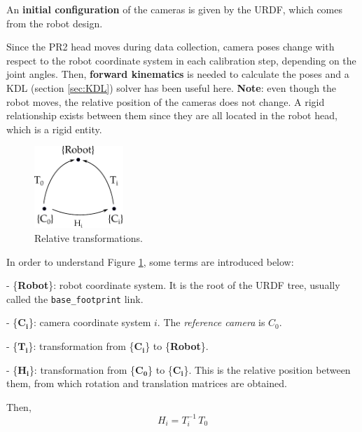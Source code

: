 An \textbf{initial configuration} of the cameras is given by the URDF, which comes from the robot design.

Since the PR2 head moves during data collection, camera poses change with respect to the robot coordinate system in each calibration step, depending on the joint angles. Then, \textbf{forward kinematics} is needed to calculate the poses and a KDL (section \ref{sec:KDL}) solver has been useful here.
\textbf{Note}: even though the robot moves, the relative position of the cameras does not change. A rigid relationship exists between them since they are all located in the robot head, which is a rigid entity.

\begin{figure}[!htbp]
 \centering
 \includegraphics[width=0.3\textwidth]{images/initialization.pdf}
 \caption{Relative transformations.}
 \label{fig:initialization}
\end{figure}

\noindent
In order to understand Figure \ref{fig:initialization}, some terms are introduced below:
\begin{itemize*}
 \item[-] \{\textbf{Robot}\}: robot coordinate system. It is the root of the URDF tree, usually called the \texttt{base\_footprint} link.

 \item[-]  \{$\mathbf{C_i}$\}: camera coordinate system $i$. The \textit{reference camera} is $C_0$.

 \item[-]  \{$\mathbf{T_i}$\}: transformation from  \{$\mathbf{C_i}$\} to \{\textbf{Robot}\}.

 \item[-] \{$\mathbf{H_i}$\}: transformation from  \{$\mathbf{C_0}$\} to  \{$\mathbf{C_i}$\}. This is the relative position between them, from which rotation and translation matrices are obtained.
\end{itemize*}

Then,
\begin{equation}
 H_i = T_i^{-1} \, T_0
\end{equation}

